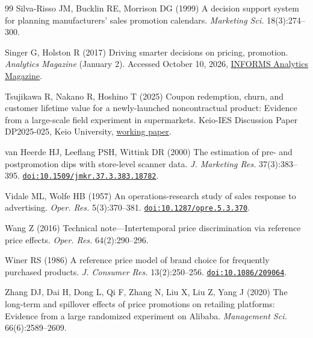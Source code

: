 \begin{thebibliography}{99}
Silva-Risso JM, Bucklin RE, Morrison DG (1999) A decision support system for planning manufacturers' sales promotion calendars. \emph{Marketing Sci.} 18(3):274--300.

Singer G, Holston R (2017) Driving smarter decisions on pricing, promotion. \emph{Analytics Magazine} (January 2). Accessed October 10, 2026, \href{https://pubsonline.informs.org/do/10.1287/LYTX.2017.01.02/full/}{INFORMS Analytics Magazine}.

Tsujikawa R, Nakano R, Hoshino T (2025) Coupon redemption, churn, and customer lifetime value for a newly-launched noncontractual product: Evidence from a large-scale field experiment in supermarkets. Keio-IES Discussion Paper DP2025-025, Keio University, \href{https://ies.keio.ac.jp/upload/DP2025-025_EN_.pdf}{working paper}.

van Heerde HJ, Leeflang PSH, Wittink DR (2000) The estimation of pre- and postpromotion dips with store-level scanner data. \emph{J. Marketing Res.} 37(3):383--395. \href{https://doi.org/10.1509/jmkr.37.3.383.18782}{\nolinkurl{doi:10.1509/jmkr.37.3.383.18782}}.

\begingroup\color{blue}
Vidale ML, Wolfe HB (1957) An operations-research study of sales response to advertising. \emph{Oper. Res.} 5(3):370--381. \href{https://doi.org/10.1287/opre.5.3.370}{\nolinkurl{doi:10.1287/opre.5.3.370}}.
\par\endgroup

 {\color{black} Wang Z (2016) Technical note---Intertemporal price discrimination via reference price effects. \emph{Oper. Res.} 64(2):290--296.}

Winer RS (1986) A reference price model of brand choice for frequently purchased products. \emph{J. Consumer Res.} 13(2):250--256. \href{https://doi.org/10.1086/209064}{\nolinkurl{doi:10.1086/209064}}.

Zhang DJ, Dai H, Dong L, Qi F, Zhang N, Liu X, Liu Z, Yang J (2020) The long-term and spillover effects of price promotions on retailing platforms: Evidence from a large randomized experiment on {A}libaba. \emph{Management Sci.} 66(6):2589--2609.

\end{thebibliography}
